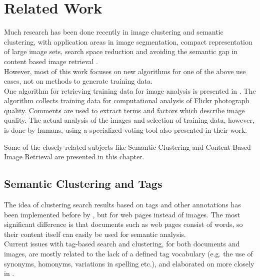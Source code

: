 \section{Related Work}
\label{sec_relatedwork}

Much research has been done recently in image clustering and semantic clustering, with application areas in image segmentation, compact representation of large image sets, search space reduction and avoiding the semantic gap in content based image retrieval \cite{Lim2011}. \\
However, most of this work focuses on new algorithms for one of the above use cases, not on methods to generate training data. \\

One algorithm for retrieving training data for image analysis is presented in \cite{Orendovici2010}. The algorithm collects training data for computational analysis of Flickr photograph quality. Comments are used to extract terms and factors which describe image quality. The actual analysis of the images and selection of training data, however, is done by humans, using a specialized voting tool also presented in their work.

\bigskip
Some of the closely related subjects like Semantic Clustering and Content-Based Image Retrieval are presented in this chapter.

\subsection{Semantic Clustering and Tags}
The idea of clustering search results based on tags and other annotations has been implemented before by \cite{Ramage2009}, but for web pages instead of images. The most significant difference is that documents such as web pages consist of words, so their content itself can easily be used for semantic analysis.\\
Current issues with tag-based search and clustering, for both documents and images, are mostly related to the lack of a defined tag vocabulary (e.g. the use of synonyms, homonyms, variations in spelling etc.), and elaborated on more closely in \cite{Auer2011}.

